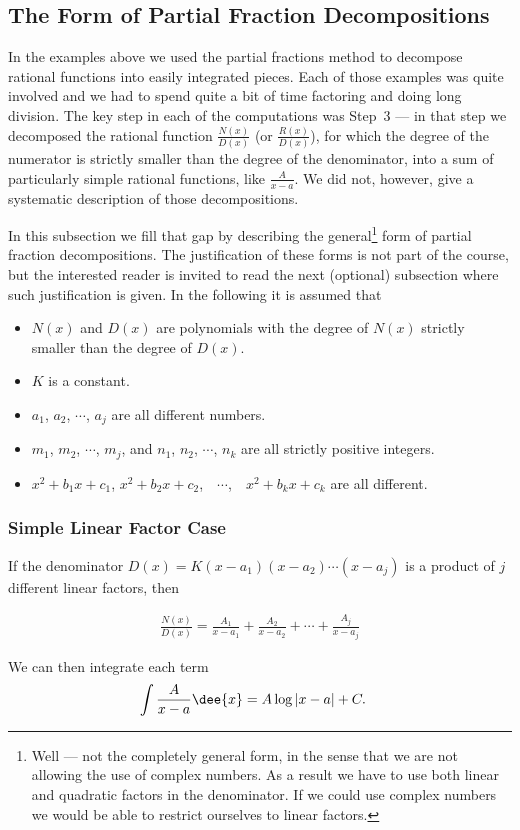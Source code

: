 \subsection{The Form of Partial Fraction Decompositions}
In the examples above we used the partial fractions method to decompose rational
functions into easily integrated pieces. Each of those examples was quite involved and we
had to spend quite a bit of time factoring and doing long division. The key step in each
of the computations was Step~3 --- in that step we decomposed the rational
function $\frac{N(x)}{D(x)}$ (or $\frac{R(x)}{D(x)}$), for which the degree
of the numerator is strictly smaller than the degree of the denominator,
into a sum of particularly simple rational functions, like $\frac{A}{x-a}$. We did not,
however, give a systematic description of those decompositions.

In this subsection we fill that gap by describing the general\footnote{Well --- not the
completely general form, in the sense that we are not allowing the use of complex numbers.
As a result we have to use both linear and quadratic factors in the denominator. If we
could use complex numbers we would be able to restrict ourselves to linear factors.} form
of partial fraction decompositions. The justification of these forms is not part of the
course, but the interested reader is invited to read the next (optional) subsection where
such justification is given. In the following it is assumed that
\begin{itemize}
\item
$N(x)$ and $D(x)$ are polynomials with the degree of $N(x)$ strictly
smaller than the degree of $D(x)$.
\item
$K$ is a constant.
\item
$a_1$, $a_2$, $\cdots$, $a_j$ are all different numbers.
\item
$m_1$, $m_2$, $\cdots$, $m_j$, and  $n_1$, $n_2$, $\cdots$, $n_k$
are all strictly positive integers.
\item
$x^2+b_1x+c_1$, $x^2+b_2x+c_2$,\ \  $\cdots$,\ \  $x^2+b_kx+c_k$ are
all different.
\end{itemize}

\subsubsection*{Simple Linear Factor Case}
If the denominator
$
D(x)=K(x-a_1)(x-a_2)\cdots(x-a_j)
$
is a product of $j$ different linear factors, then
\begin{impeqn}\label{eq:PFdecompa}
\begin{align*}
\frac{N(x)}{D(x)}
=\frac{A_1}{x-a_1}+\frac{A_2}{x-a_2}+\cdots+\frac{A_j}{x-a_j}
\end{align*}
\end{impeqn}
We can then integrate each term
\begin{align*}
\int \frac{A}{x-a}\dee{x} &= A\log|x-a| +C.
\end{align*}


